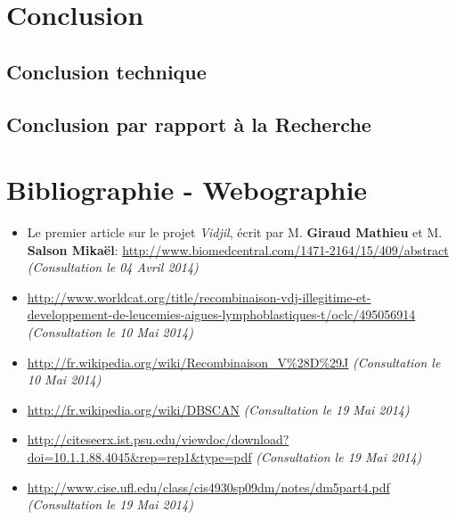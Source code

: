 \documentclass[12pt]{report}
\begin{document}
\begin{spacing}{1.2}
\chapter*{Conclusion}


\section*{Conclusion technique}

\section*{Conclusion par rapport à la Recherche}

\chapter*{Bibliographie - Webographie}


\begin{itemize}
\item{Le premier article sur le projet \textit{Vidjil}, écrit par M. \textbf{Giraud Mathieu} et M. \textbf{Salson Mikaël}: \url{http://www.biomedcentral.com/1471-2164/15/409/abstract} \textit{(Consultation le 04 Avril 2014)}}
\item{\url{http://www.worldcat.org/title/recombinaison-vdj-illegitime-et-developpement-de-leucemies-aigues-lymphoblastiques-t/oclc/495056914} \textit{(Consultation le 10 Mai 2014)}}
\item{\url{http://fr.wikipedia.org/wiki/Recombinaison_V%28D%29J} \textit{(Consultation le 10 Mai 2014)}}
\item{\url{http://fr.wikipedia.org/wiki/DBSCAN} \textit{(Consultation le 19 Mai 2014)}}
\item{\url{http://citeseerx.ist.psu.edu/viewdoc/download?doi=10.1.1.88.4045&rep=rep1&type=pdf} \textit{(Consultation le 19 Mai 2014)}}
\item{\url{http://www.cise.ufl.edu/class/cis4930sp09dm/notes/dm5part4.pdf} \textit{(Consultation le 19 Mai 2014)}}
\end{itemize}

\end{spacing}
\end{document}
